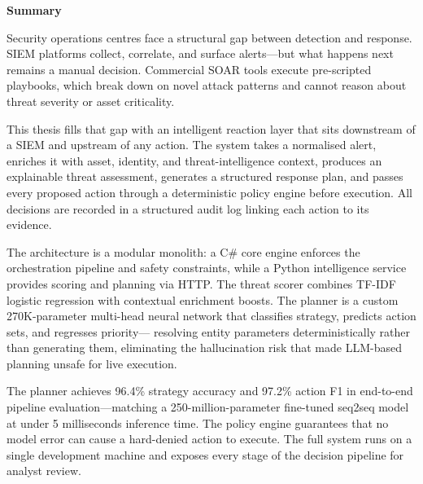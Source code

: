 
\cleardoublepage
\newpage
\thispagestyle{empty}
{}

\begin{center}\huge \textbf{Summary}\end{center}

\vfill

\begin{flushleft}
\large

Security operations centres face a structural gap between detection and response. SIEM
platforms collect, correlate, and surface alerts---but what happens next remains a manual
decision. Commercial SOAR tools execute pre-scripted playbooks, which break down on
novel attack patterns and cannot reason about threat severity or asset criticality.

This thesis fills that gap with an intelligent reaction layer that sits downstream of a
SIEM and upstream of any action. The system takes a normalised alert, enriches it with
asset, identity, and threat-intelligence context, produces an explainable threat
assessment, generates a structured response plan, and passes every proposed action
through a deterministic policy engine before execution. All decisions are recorded in a
structured audit log linking each action to its evidence.

The architecture is a modular monolith: a C\# core engine enforces the orchestration
pipeline and safety constraints, while a Python intelligence service provides scoring
and planning via HTTP. The threat scorer combines TF-IDF logistic regression with
contextual enrichment boosts. The planner is a custom 270K-parameter multi-head neural
network that classifies strategy, predicts action sets, and regresses priority---
resolving entity parameters deterministically rather than generating them, eliminating
the hallucination risk that made LLM-based planning unsafe for live execution.

The planner achieves 96.4\% strategy accuracy and 97.2\% action F1 in end-to-end
pipeline evaluation---matching a 250-million-parameter fine-tuned seq2seq model at
under 5 milliseconds inference time. The policy engine guarantees that no model error
can cause a hard-denied action to execute. The full system runs on a single development
machine and exposes every stage of the decision pipeline for analyst review.

\end{flushleft}

